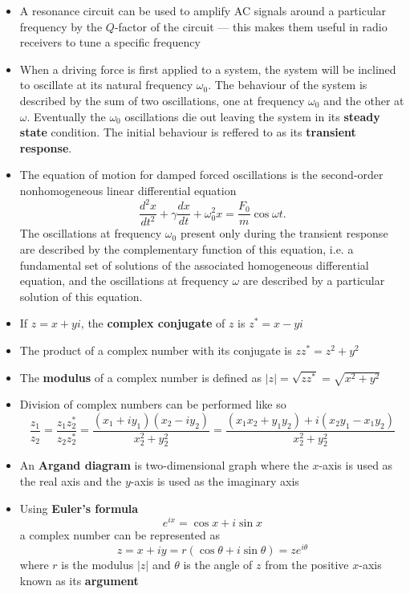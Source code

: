 \documentclass{article}
\begin{document}
\begin{itemize}
  \item A resonance circuit can be used to amplify AC signals around a particular frequency by the $Q$-factor of the circuit — this makes them useful in radio receivers to tune a specific frequency

  \item When a driving force is first applied to a system, the system will be inclined to oscillate at its natural frequency $\omega_0$. The behaviour of the system is described by the sum of two oscillations, one at frequency $\omega_0$ and the other at $\omega$. Eventually the $\omega_0$ oscillations die out leaving the system in its \textbf{steady state} condition. The initial behaviour is reffered to as its \textbf{transient response}.

  \item The equation of motion for damped forced oscillations is the second-order nonhomogeneous linear differential equation \[\frac{d^2 x}{d t^2} + \gamma \frac{d x}{d t} + \omega_0^2 x = \frac{F_0}{m} \cos \omega t.\] The oscillations at frequency $\omega_0$ present only during the transient response are described by the complementary function of this equation, i.e. a fundamental set of solutions of the associated homogeneous differential equation, and the oscillations at frequency $\omega$ are described by a particular solution of this equation.

  \item If $z = x + y i$, the \textbf{complex conjugate} of $z$ is $z^* = x - y i$

  \item The product of a complex number with its conjugate is $z z^* = z^2 + y^2$

  \item The \textbf{modulus} of a complex number is defined as $|z| = \sqrt{z z^*} = \sqrt{x^2 + y^2}$

  \item Division of complex numbers can be performed like so \[\frac{z_1}{z_2} = \frac{z_1 z_2^*}{z_2 z_2^*} = \frac{(x_1 + i y_1) (x_2 - i y_2)}{x_2^2 + y_2^2} = \frac{(x_1 x_2 + y_1 y_2) + i (x_2 y_1 - x_1 y_2)}{x_2^2 + y_2^2}\]

  \item An \textbf{Argand diagram} is two-dimensional graph where the $x$-axis is used as the real axis and the $y$-axis is used as the imaginary axis

  \item Using \textbf{Euler's formula} \[e^{i x} = \cos x + i \sin x\] a complex number can be represented as \[z = x + i y = r (\cos \theta + i \sin \theta) = z e^{i \theta}\] where $r$ is the modulus $|z|$ and $\theta$ is the angle of $z$ from the positive $x$-axis known as its \textbf{argument}


\end{itemize}
\end{document}
